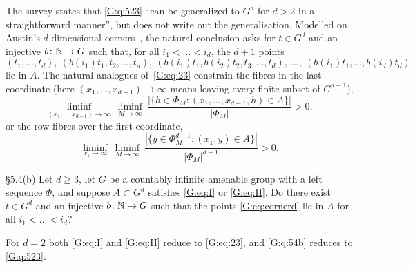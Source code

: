 The survey states that \cref{G:q:523} ``can be generalized to $G^d$ for $d>2$ in a
straightforward manner'', but does not write out the generalisation. Modelled on
Austin's $d$-dimensional corners~\cite[Theorem~5.22]{kra2023problems}, the natural
conclusion asks for $t\in G^d$ and an injective $b\colon\mathbb{N}\to G$ such that, for all
$i_1<\dots<i_d$, the $d+1$ points
\begin{equation}\label{G:eq:cornerd}
(t_1,\dots,t_d),\ (b(i_1)t_1,t_2,\dots,t_d),\ (b(i_1)t_1,b(i_2)t_2,t_3,\dots,t_d),\ \dots,\
(b(i_1)t_1,\dots,b(i_d)t_d)
\end{equation}
lie in $A$. The natural analogues of~\eqref{G:eq:23} constrain the fibres in the last
coordinate (here $(x_1,\dots,x_{d-1})\to\infty$ means leaving every finite subset of $G^{d-1}$),
\begin{equation}\label{G:eq:I}
\liminf_{(x_1,\dots,x_{d-1})\to\infty}\ \liminf_{M\to\infty}\
\frac{|\{h\in\Phi_M:(x_1,\dots,x_{d-1},h)\in A\}|}{|\Phi_M|}>0,
\end{equation}
or the row fibres over the first coordinate,
\begin{equation}\label{G:eq:II}
\liminf_{x_1\to\infty}\ \liminf_{M\to\infty}\
\frac{|\{y\in\Phi_M^{d-1}:(x_1,y)\in A\}|}{|\Phi_M|^{d-1}}>0.
\end{equation}

\begin{question}{\S5.4(b)}\label{G:q:54b}
Let $d\ge3$, let $G$ be a countably infinite amenable group with a left \Fol{} sequence
$\Phi$, and suppose $A\subset G^d$ satisfies \eqref{G:eq:I} or \eqref{G:eq:II}. Do there
exist $t\in G^d$ and an injective $b\colon\mathbb{N}\to G$ such that the points
\eqref{G:eq:cornerd} lie in $A$ for all $i_1<\dots<i_d$?
\end{question}

For $d=2$ both \eqref{G:eq:I} and \eqref{G:eq:II} reduce to \eqref{G:eq:23}, and
\cref{G:q:54b} reduces to \cref{G:q:523}.

